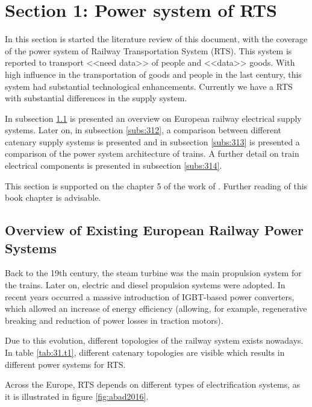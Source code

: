 




\section{Section 1: Power system of RTS}


In this section is started the literature review of this document, with the coverage of the power system of Railway Transportation System (RTS). This system is reported to transport <<need data>> of people and <<data>> goods. With high influence in the transportation of goods and people in the last century, this system had substantial technological enhancements. Currently we have a RTS with substantial differences in the supply system.

In subsection \ref{subs:311} is presented an overview on European railway electrical supply systems. Later on, in subsection \ref{subs:312}, a comparison between different catenary supply systems is presented and in subsection \ref{subs:313} is presented a comparison of the power system architecture of trains. A further detail on train electrical components is presented in subsection \ref{subs:314}.

This section is supported on the chapter 5 of the work of \cite{abad2016}. Further reading of this book chapter is advisable. 

\subsection{Overview of Existing European Railway Power Systems}
\label{subs:311}
Back to the 19th century, the steam turbine was the main propulsion system for the trains. Later on, electric and diesel propulsion systems were adopted. In recent years occurred a massive introduction of IGBT-based power converters, which allowed an increase of energy efficiency (allowing, for example, regenerative breaking and reduction of power losses in traction motors).

Due to this evolution, different topologies of the railway system exists nowadays. In table \ref{tab:31.t1}, different catenary topologies are visible which results in different power systems for RTS.




Across the Europe, RTS depends on different types of electrification systems, as it is illustrated in figure \ref{fig:abad2016}.


